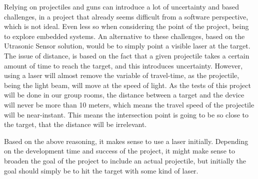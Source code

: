 Relying on projectiles and guns can introduce a lot of uncertainty and based challenges, in a project that already seems difficult from a software perspective, which is not ideal.
Even less so when considering the point of the project, being to explore embedded systems.
An alternative to these challenges, based on the Utrasonic Sensor solution, would be to simply point a visible laser at the target.
The issue of distance, is based on the fact that a given projectile takes a certain amount of time to reach the target, and this introduces uncertainty. 
However, using a laser will almost remove the variable of travel-time, as the projectile, being the light beam, will move at the speed of light.
As the tests of this project will be done in our group rooms, the distance between a target and the device will never be more than 10 meters, which means the travel speed of the projectile will be near-instant. 
This means the intersection point is going to be so close to the target, that the distance will be irrelevant.


Based on the above reasoning, it makes sense to use a laser initially.
Depending on the development time and success of the project, it might make sense to broaden the goal of the project to include an actual projectile, but initially the goal should simply be to hit the target with some kind of laser.
